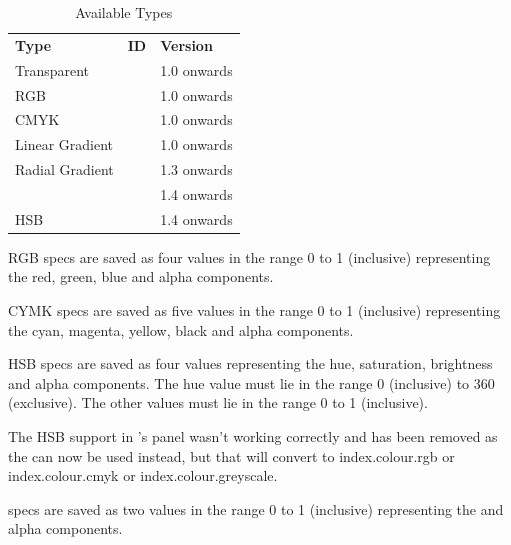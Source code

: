 \begin{deflist}
\begin{itemdesc}
\begin{table}[htbp]
\caption{Available  Types}
\label{tab:jdrcolourtypes}
\centering
\begin{tabular}{lll}
\bfseries Type & \bfseries ID & \bfseries Version\\
Transparent & \code{T} & 1.0 onwards\\
RGB & \code{R} & 1.0 onwards\\
CMYK & \code{C} & 1.0 onwards\\
Linear Gradient & \code{G} & 1.0 onwards\\
Radial Gradient & \code{D} & 1.3 onwards\\
\Manmsg{grey} & \code{Y} & 1.4 onwards\\
HSB & \code{S} & 1.4 onwards
\end{tabular}
\end{table}
\end{itemdesc}


\begin{itemdesc}
RGB  specs are saved as four  values in the
range 0 to 1 (inclusive) representing the red, green, blue and alpha
components.
\end{itemdesc}

\begin{itemdesc}
CYMK  specs are saved as five  values in the
range 0 to 1 (inclusive) representing the cyan, magenta, yellow, black
and alpha components.
\end{itemdesc}

\begin{itemdesc}
HSB  specs are saved as four  values
representing the hue, saturation, brightness and alpha components.
The hue value must lie in the range 0 (inclusive) to 360
(exclusive). The other values must lie in the range 0 to 1
(inclusive).

The HSB support in \FlowframTk's  panel 
wasn't working correctly and has been removed as the
 can now be used instead, but that will convert
to \gls{index.colour.rgb} or \gls{index.colour.cmyk} or
\gls{index.colour.greyscale}.

\end{itemdesc}

\begin{itemdesc}
 specs are saved as two  values in the range 0 to
1 (inclusive) representing the  and alpha components.
\end{itemdesc}


\end{deflist}
